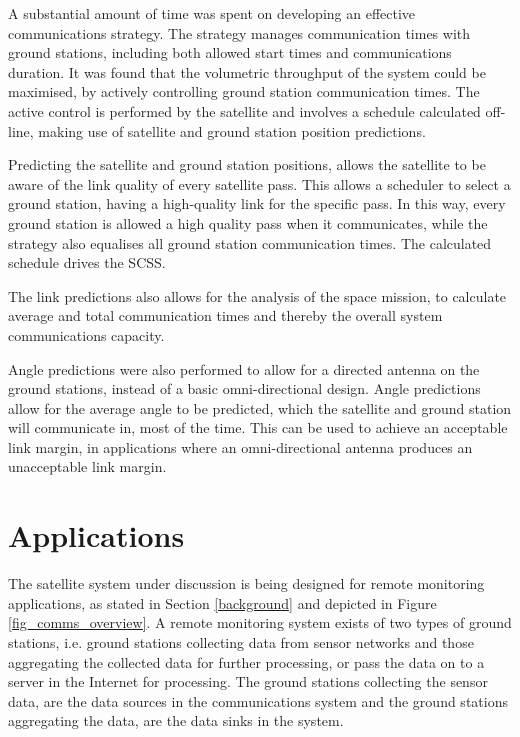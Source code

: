 A substantial amount of time was spent on developing an effective communications strategy. The strategy
manages communication times with ground stations, including both allowed start times and communications
duration. It was found that the volumetric throughput of the system could be maximised, by actively controlling
ground station communication times. The active control is performed by the satellite and involves a schedule
calculated off-line, making use of satellite and ground station position predictions.

Predicting the satellite and ground station positions, allows the satellite to be aware of the link quality
of every satellite pass. This allows a scheduler to select a ground station, having a high-quality link for
the specific pass. In this way, every ground station is allowed a high quality pass when it communicates,
while the strategy also equalises all ground station communication times. The calculated schedule drives
the SCSS.

The link predictions also allows for the analysis of the space mission, to calculate average and total communication
times and thereby the overall system communications capacity.

Angle predictions were also performed to allow for a directed antenna on the ground stations, instead of
a basic omni-directional design. Angle predictions allow for the average angle to be predicted, which
the satellite and ground station will communicate in, most of the time. This can be used to achieve
an acceptable link margin, in applications where an omni-directional antenna produces an unacceptable
link margin.

\section{Applications}
\label{applications}

The satellite system under discussion is being designed for remote monitoring applications, as stated in Section
\ref{background} and depicted in Figure \ref{fig_comms_overview}. A remote monitoring system exists of two types
of ground stations, i.e. ground stations collecting data from sensor networks and those aggregating the collected
data for further processing, or pass the data on to a server in the Internet for processing. The ground stations
collecting the sensor data, are the data sources in the communications system and the ground stations aggregating
the data, are the data sinks in the system.

